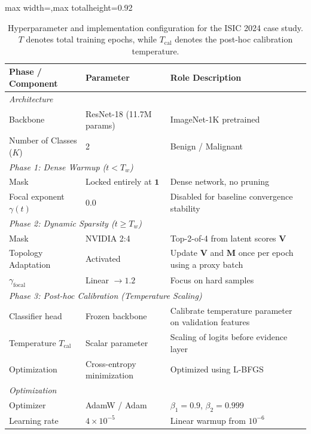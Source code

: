 \documentclass[letterpaper]{article} %
\begin{document}
\begin{table}[H]
\centering
\caption{Hyperparameter and implementation configuration for the ISIC 2024 case study. $T$ denotes total training epochs, while $T_{\text{cal}}$ denotes the post-hoc calibration temperature.}
\label{tab:config}
\scriptsize
\renewcommand{\arraystretch}{0.9}
\setlength{\tabcolsep}{2.0pt}
\begin{adjustbox}{max width=\columnwidth,max totalheight=0.92\textheight}
\begin{tabular}{@{}p{}p{}p{}@{}}
\toprule
\textbf{Phase / Component} & \textbf{Parameter} & \textbf{Role Description} \\
\midrule
\multicolumn{3}{l}{\emph{Architecture}} \\
Backbone & ResNet-18 (11.7M params) & ImageNet-1K pretrained \\
Number of Classes ($K$) & 2 & Benign / Malignant \\
\midrule
\multicolumn{3}{l}{\emph{Phase 1: Dense Warmup ($t < T_w$)}} \\
Mask & Locked entirely at $\bm{1}$ & Dense network, no pruning \\
Focal exponent $\gamma(t)$ & $0.0$ & Disabled for baseline convergence stability \\
\midrule
\multicolumn{3}{l}{\emph{Phase 2: Dynamic Sparsity ($t \ge T_w$)}} \\
Mask & NVIDIA 2:4 & Top-2-of-4 from latent scores $\bm{V}$ \\
Topology Adaptation & Activated & Update $\bm{V}$ and $\bm{M}$ once per epoch using a proxy batch \\
$\gamma_{\text{focal}}$ & Linear $\to 1.2$ & Focus on hard samples \\
\midrule
\multicolumn{3}{l}{\emph{Phase 3: Post-hoc Calibration (Temperature Scaling)}} \\
Classifier head & Frozen backbone & Calibrate temperature parameter on validation features \\
Temperature $T_{\text{cal}}$ & Scalar parameter & Scaling of logits before evidence layer \\
Optimization & Cross-entropy minimization & Optimized using L-BFGS \\
\midrule
\multicolumn{3}{l}{\emph{Optimization}} \\
Optimizer & AdamW / Adam~\cite{loshchilov2019decoupled,kingma2015adam} & $\beta_1=0.9$, $\beta_2=0.999$ \\
Learning rate & $4 \times 10^{-5}$ & Linear warmup from $10^{-6}$ \\

\end{tabular}
\end{adjustbox}
\end{table}
\end{document}
